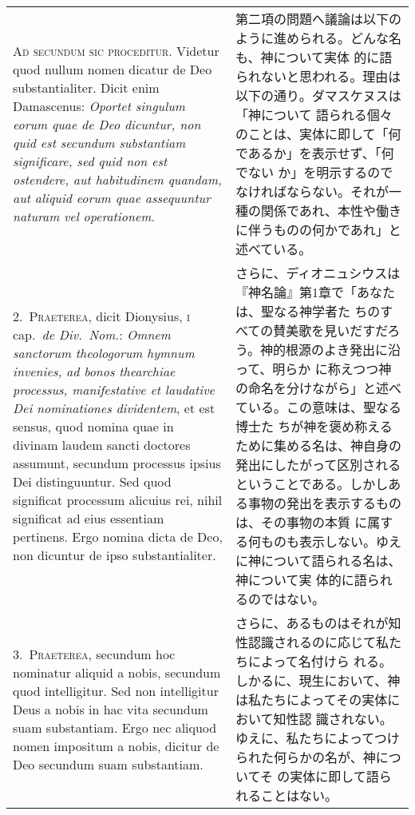 \documentclass[paper=a4paper,fontsize=10pt,jafontsize=9pt,titlepage]{jlreq}
\begin{document}
\begin{longtable}{p{21em}p{21em}}

{\scshape Ad secundum sic proceditur}. Videtur quod nullum nomen dicatur de
Deo substantialiter. Dicit enim Damascenus: {\itshape Oportet singulum
eorum quae de Deo dicuntur, non quid est secundum substantiam
significare, sed quid non est ostendere, aut habitudinem quandam, aut
aliquid eorum quae assequuntur naturam vel operationem}.

&

第二項の問題へ議論は以下のように進められる。どんな名も、神について実体
的に語られないと思われる。理由は以下の通り。ダマスケヌスは「神について
語られる個々のことは、実体に即して「何であるか」を表示せず、「何でない
か」を明示するのでなければならない。それが一種の関係であれ、本性や働き
に伴うものの何かであれ」と述べている。

\\

2.~{\scshape Praeterea}, dicit Dionysius, {\scshape i} cap.\ {\itshape de Div.\
Nom.}: {\itshape Omnem sanctorum theologorum hymnum invenies, ad bonos
thearchiae processus, manifestative et laudative Dei nominationes
dividentem}, et est sensus, quod nomina quae in divinam laudem sancti
doctores assumunt, secundum processus ipsius Dei distinguuntur. Sed
quod significat processum alicuius rei, nihil significat ad eius
essentiam pertinens. Ergo nomina dicta de Deo, non dicuntur de ipso
substantialiter.

&

さらに、ディオニュシウスは『神名論』第1章で「あなたは、聖なる神学者た
ちのすべての賛美歌を見いだすだろう。神的根源のよき発出に沿って、明らか
に称えつつ神の命名を分けながら」と述べている。この意味は、聖なる博士た
ちが神を褒め称えるために集める名は、神自身の発出にしたがって区別される
ということである。しかしある事物の発出を表示するものは、その事物の本質
に属する何ものも表示しない。ゆえに神について語られる名は、神について実
体的に語られるのではない。

\\

3.~{\scshape Praeterea}, secundum hoc nominatur aliquid a nobis, secundum
quod intelligitur. Sed non intelligitur Deus a nobis in hac vita
secundum suam substantiam. Ergo nec aliquod nomen impositum a nobis,
dicitur de Deo secundum suam substantiam.

&

さらに、あるものはそれが知性認識されるのに応じて私たちによって名付けら
れる。しかるに、現生において、神は私たちによってその実体において知性認
識されない。ゆえに、私たちによってつけられた何らかの名が、神についてそ
の実体に即して語られることはない。


\end{longtable}
\end{document}
